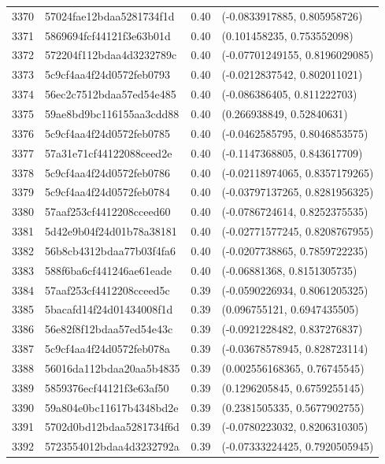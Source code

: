 \begin{table}[ht]
\begin{tabular}{rlrl}
  3370 & 57024fae12bdaa5281734f1d & 0.40 & (-0.0833917885, 0.805958726) \\ 
  3371 & 5869694fcf44121f3e63b01d & 0.40 & (0.101458235, 0.753552098) \\ 
  3372 & 572204f112bdaa4d3232789c & 0.40 & (-0.07701249155, 0.8196029085) \\ 
  3373 & 5c9cf4aa4f24d0572feb0793 & 0.40 & (-0.0212837542, 0.802011021) \\ 
  3374 & 56ec2c7512bdaa57ed54e485 & 0.40 & (-0.086386405, 0.811222703) \\ 
  3375 & 59ae8bd9bc116155aa3cdd88 & 0.40 & (0.266938849, 0.52840631) \\ 
  3376 & 5c9cf4aa4f24d0572feb0785 & 0.40 & (-0.0462585795, 0.8046853575) \\ 
  3377 & 57a31e71cf44122088ceed2e & 0.40 & (-0.1147368805, 0.843617709) \\ 
  3378 & 5c9cf4aa4f24d0572feb0786 & 0.40 & (-0.02118974065, 0.8357179265) \\ 
  3379 & 5c9cf4aa4f24d0572feb0784 & 0.40 & (-0.03797137265, 0.8281956325) \\ 
  3380 & 57aaf253cf4412208cceed60 & 0.40 & (-0.0786724614, 0.8252375535) \\ 
  3381 & 5d42e9b04f24d01b78a38181 & 0.40 & (-0.02771577245, 0.8208767955) \\ 
  3382 & 56b8cb4312bdaa77b03f4fa6 & 0.40 & (-0.0207738865, 0.7859722235) \\ 
  3383 & 588f6ba6cf441246ae61eade & 0.40 & (-0.06881368, 0.8151305735) \\ 
  3384 & 57aaf253cf4412208cceed5c & 0.39 & (-0.0590226934, 0.8061205325) \\ 
  3385 & 5bacafd14f24d01434008f1d & 0.39 & (0.096755121, 0.6947435505) \\ 
  3386 & 56e82f8f12bdaa57ed54e43c & 0.39 & (-0.0921228482, 0.837276837) \\ 
  3387 & 5c9cf4aa4f24d0572feb078a & 0.39 & (-0.03678578945, 0.828723114) \\ 
  3388 & 56016da112bdaa20aa5b4835 & 0.39 & (0.002556168365, 0.76745545) \\ 
  3389 & 5859376ecf44121f3e63af50 & 0.39 & (0.1296205845, 0.6759255145) \\ 
  3390 & 59a804e0bc11617b4348bd2e & 0.39 & (0.2381505335, 0.5677902755) \\ 
  3391 & 5702d0bd12bdaa5281734f6d & 0.39 & (-0.0780223032, 0.8206310305) \\ 
  3392 & 5723554012bdaa4d3232792a & 0.39 & (-0.07333224425, 0.7920505945) \\ 

\end{tabular}
\end{table}
